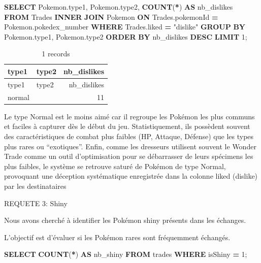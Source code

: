 \documentclass[mstat,12pt]{unswthesis}
\newenvironment{Shaded}{\begin{snugshade}}{\end{snugshade}}
\newcommand{\DecValTok}[1]{\textcolor[rgb]{0.00,0.00,0.81}{#1}}
\newcommand{\FunctionTok}[1]{\textcolor[rgb]{0.13,0.29,0.53}{\textbf{#1}}}
\newcommand{\KeywordTok}[1]{\textcolor[rgb]{0.13,0.29,0.53}{\textbf{#1}}}
\newcommand{\NormalTok}[1]{#1}
\newcommand{\OperatorTok}[1]{\textcolor[rgb]{0.81,0.36,0.00}{\textbf{#1}}}
\newcommand{\OtherTok}[1]{\textcolor[rgb]{0.56,0.35,0.01}{#1}}
\newcommand{\StringTok}[1]{\textcolor[rgb]{0.31,0.60,0.02}{#1}}
\begin{document}
\begin{Shaded}
\begin{Highlighting}[]
\KeywordTok{SELECT}\NormalTok{ Pokemon.type1, Pokemon.type2, }\FunctionTok{COUNT}\NormalTok{(}\OperatorTok{*}\NormalTok{) }\KeywordTok{AS}\NormalTok{ nb\_dislikes }
\KeywordTok{FROM}\NormalTok{ Trades }
\KeywordTok{INNER} \KeywordTok{JOIN}\NormalTok{ Pokemon }\KeywordTok{ON}\NormalTok{ Trades.pokemonId }\OperatorTok{=}\NormalTok{ Pokemon.pokedex\_number }
\KeywordTok{WHERE}\NormalTok{ Trades.liked }\OperatorTok{=} \OtherTok{"dislike"} 
\KeywordTok{GROUP} \KeywordTok{BY}\NormalTok{ Pokemon.type1, Pokemon.type2 }
\KeywordTok{ORDER} \KeywordTok{BY}\NormalTok{ nb\_dislikes }\KeywordTok{DESC} 
\KeywordTok{LIMIT} \DecValTok{1}\NormalTok{;}
\end{Highlighting}
\end{Shaded}

\begin{longtable}[]{@{}llr@{}}
\caption{1 records}\tabularnewline
\toprule\noalign{}
type1 & type2 & nb\_dislikes \\
\midrule\noalign{}
\endfirsthead
\toprule\noalign{}
type1 & type2 & nb\_dislikes \\
\midrule\noalign{}
\endhead
\bottomrule\noalign{}
\endlastfoot
normal & & 11 \\
\end{longtable}

Le type Normal est le moins aimé car il regroupe les Pokémon les plus
communs et faciles à capturer dès le début du jeu. Statistiquement, ils
possèdent souvent des caractéristiques de combat plus faibles (HP,
Attaque, Défense) que les types plus rares ou ``exotiques''. Enfin,
comme les dresseurs utilisent souvent le Wonder Trade comme un outil
d'optimisation pour se débarrasser de leurs spécimens les plus faibles,
le système se retrouve saturé de Pokémon de type Normal, provoquant une
déception systématique enregistrée dans la colonne liked (dislike) par
les destinataires

\bigskip

REQUETE 3: Shiny

\bigskip

Nous avons cherché à identifier les Pokémon shiny présents dans les
échanges.

L'objectif est d'évaluer si les Pokémon rares sont fréquemment échangés.

\begin{Shaded}
\begin{Highlighting}[]
\KeywordTok{SELECT} \FunctionTok{COUNT}\NormalTok{(}\OperatorTok{*}\NormalTok{) }\KeywordTok{AS}\NormalTok{ nb\_shiny }
\KeywordTok{FROM}\NormalTok{ trades }
\KeywordTok{WHERE}\NormalTok{ isShiny }\OperatorTok{=} \StringTok{\textquotesingle{}1\textquotesingle{}}\NormalTok{;}
\end{Highlighting}
\end{Shaded}
\end{document}
